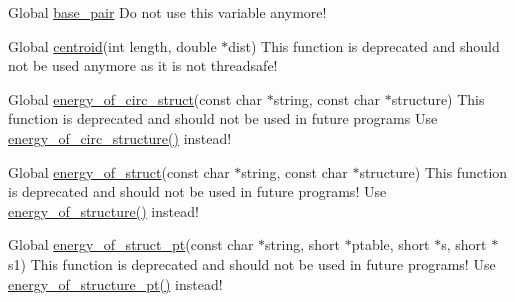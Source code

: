 \label{deprecated__deprecated000008}
\hypertarget{deprecated__deprecated000008}{}
 
\begin{DoxyDescription}
\item[Global \hyperlink{fold__vars_8h_a0244a629b5ab4f58b77590c3dfd130dc}{base\_\-pair} ]Do not use this variable anymore! 
\end{DoxyDescription}

\label{deprecated__deprecated000012}
\hypertarget{deprecated__deprecated000012}{}
 
\begin{DoxyDescription}
\item[Global \hyperlink{part__func_8h_ae89a63bd83e75a80b2ba36d20b31ce81}{centroid}(int length, double $\ast$dist) ]This function is deprecated and should not be used anymore as it is not threadsafe! 
\end{DoxyDescription}

\label{deprecated__deprecated000007}
\hypertarget{deprecated__deprecated000007}{}
 
\begin{DoxyDescription}
\item[Global \hyperlink{fold_8h_a657222e2758c46bf13b416ef3032e417}{energy\_\-of\_\-circ\_\-struct}(const char $\ast$string, const char $\ast$structure) ]This function is deprecated and should not be used in future programs Use \hyperlink{fold_8h_aeb14f3664aec67fc03268ac75253f0f8}{energy\_\-of\_\-circ\_\-structure()} instead!


\end{DoxyDescription}

\label{deprecated__deprecated000005}
\hypertarget{deprecated__deprecated000005}{}
 
\begin{DoxyDescription}
\item[Global \hyperlink{fold_8h_ac2b37fea2145c94d925a3f33378ef87b}{energy\_\-of\_\-struct}(const char $\ast$string, const char $\ast$structure) ]This function is deprecated and should not be used in future programs! Use \hyperlink{fold_8h_af93986cb3cb29770ec9cca69c9fab8cf}{energy\_\-of\_\-structure()} instead!


\end{DoxyDescription}

\label{deprecated__deprecated000006}
\hypertarget{deprecated__deprecated000006}{}
 
\begin{DoxyDescription}
\item[Global \hyperlink{fold_8h_a27ce6f68512d43bf1fe14a06c9d76d5c}{energy\_\-of\_\-struct\_\-pt}(const char $\ast$string, short $\ast$ptable, short $\ast$s, short $\ast$s1) ]This function is deprecated and should not be used in future programs! Use \hyperlink{fold_8h_a8831445966b761417e713360791299d8}{energy\_\-of\_\-structure\_\-pt()} instead!


\end{DoxyDescription}

